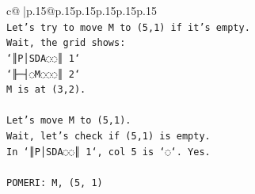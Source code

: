 \documentclass{article}
\begin{document}
{\begin{supertabular}{c@{$\;$}|p{.15\linewidth}@{}p{.15\linewidth}p{.15\linewidth}p{.15\linewidth}p{.15\linewidth}p{.15\linewidth}}
{{{\\ 
\texttt{Let's try to move M to (5,1) if it's empty.} \\
\texttt{Wait, the grid shows:} \\
\texttt{`║P│SDA◌◌║ 1`} \\
\texttt{`╟─┤◌M◌◌◌║ 2`} \\
\texttt{M is at (3,2).} \\
\\ 
\texttt{Let's move M to (5,1).} \\
\texttt{Wait, let's check if (5,1) is empty.} \\
\texttt{In `║P│SDA◌◌║ 1`, col 5 is `◌`. Yes.} \\
\\ 
\texttt{POMERI: M, (5, 1)} \\
            }
        }
    }
     \\ \\


\end{supertabular}}
\end{document}
